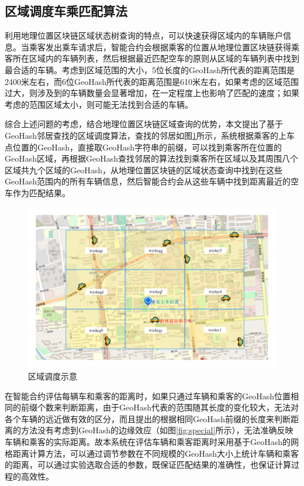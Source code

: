 \subsection{区域调度车乘匹配算法}

利用地理位置区块链区域状态树查询的特点，可以快速获得区域内的车辆账户信息。当乘客发出乘车请求后，智能合约会根据乘客的位置从地理位置区块链获得乘客所在区域内的车辆列表，然后根据最近匹配空车的原则从区域的车辆列表中找到最合适的车辆。考虑到区域范围的大小，5位长度的GeoHash所代表的距离范围是2400米左右，而6位GeoHash所代表的距离范围是610米左右，如果考虑的区域范围过大，则涉及到的车辆数量会显著增加，在一定程度上也影响了匹配的速度；如果考虑的范围区域太小，则可能无法找到合适的车辆。\par

综合上述问题的考虑，结合地理位置区块链区域查询的优势，本文提出了基于GeoHash邻居查找的区域调度算法，查找的邻居如图\ref{fig:regionManage}所示，系统根据乘客的上车点位置的GeoHash，直接取GeoHash字符串的前缀，可以找到乘客所在位置的GeoHash区域，再根据GeoHash查找邻居的算法找到乘客所在区域以及其周围八个区域共九个区域的GeoHash，从地理位置区块链的区域状态查询中找到在这些GeoHash范围内的所有车辆信息，然后智能合约会从这些车辆中找到距离最近的空车作为匹配结果。\par

\begin{figure}
  \centering
  \includegraphics[width=1.0\textwidth]{figures/区域调度}
  \caption{区域调度示意}\label{fig:regionManage}
\end{figure}

在智能合约评估每辆车和乘客的距离时，如果只通过车辆和乘客的GeoHash位置相同的前缀个数来判断距离，由于GeoHash代表的范围随其长度的变化较大，无法对各个车辆的远近做有效的区分，而且提出的根据相同GeoHash前缀的长度来判断距离的方法没有考虑到GeoHash的边缘效应（如图\ref{fig:special}所示），无法准确反映车辆和乘客的实际距离。故本系统在评估车辆和乘客距离时采用基于GeoHash的网格距离计算方法，可以通过调节参数在不同规模的GeoHash大小上统计车辆和乘客的距离，可以通过实验选取合适的参数，既保证匹配结果的准确性，也保证计算过程的高效性。\par

